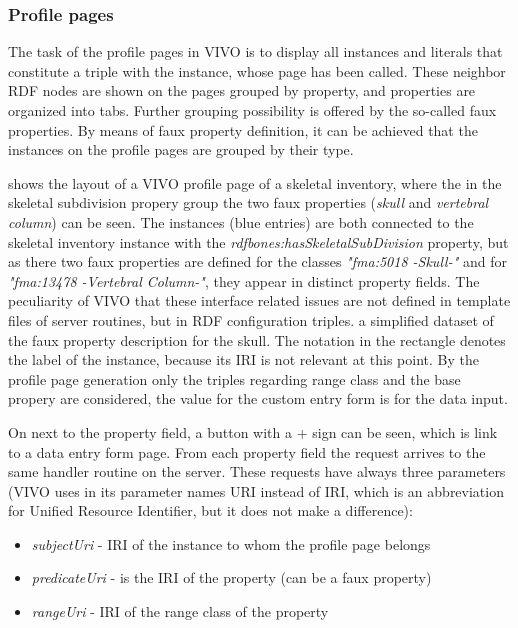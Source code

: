 \subsubsection{Profile pages} \label{vivoPp}

The task of the profile pages in VIVO is to display all instances and literals that constitute a triple with the instance, whose page has been called. These neighbor RDF nodes are shown on the pages grouped by property, and properties are organized into tabs. Further grouping possibility is offered by the so-called faux properties. By means of faux property definition, it can be achieved that the instances on the profile pages are grouped by their type.


 shows the layout of a VIVO profile page of a skeletal inventory, where the in the skeletal subdivision propery group the two faux properties (\textit{skull} and \textit{vertebral column}) can be seen. The instances (blue entries) are both connected to the skeletal inventory instance with the \textit{rdfbones:hasSkeletalSubDivision} property, but as there two faux properties are defined for the classes \textit{"fma:5018 -Skull-"} and for \textit{"fma:13478 -Vertebral Column-"}, they appear in distinct property fields. The peculiarity of VIVO that these interface related issues are not defined in template files of server routines, but in RDF configuration triples.  a simplified dataset of the faux property description for the skull. The notation in the rectangle denotes the label of the instance, because its IRI is not relevant at this point. By the profile page generation only the triples regarding range class and the base propery are considered, the value for the custom entry form is for the data input. 


On  next to the property field, a button with a + sign can be seen, which is link to a data entry form page. From each property field the request arrives to the same handler routine on the server. These requests have always three parameters (VIVO uses in its parameter names URI instead of IRI, which is an abbreviation for Unified Resource Identifier, but it does not make a difference):

\begin{itemize}
	\item{ \textit{subjectUri}} - IRI of the instance to whom the profile page belongs
	\item{ \textit{predicateUri}} -  is the IRI of the property (can be a faux property)
	\item{ \textit{rangeUri}} - IRI of the range class of the property
\end{itemize}

